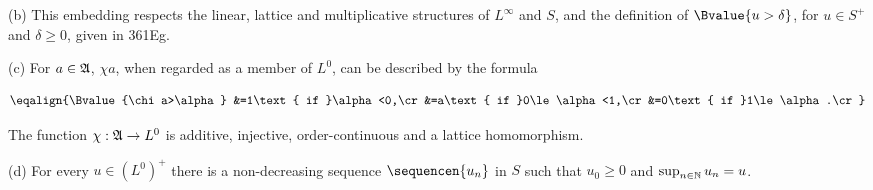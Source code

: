 (b) This embedding respects the linear, lattice and multiplicative
structures of $L^{\infty}$ and $S$, and the definition of
$\Bvalue{u>\delta}$, for $u\in S^+$ and $\delta\ge 0$, given in 361Eg.

(c) For $a\in\frak A$, $\chi a$, when regarded as a member of $L^0$, can
be described by the formula

$$\eqalign{\Bvalue{\chi a>\alpha}
&=1\text{ if }\alpha<0,\cr
&=a\text{ if }0\le\alpha<1,\cr
&=0\text{ if }1\le\alpha.\cr}$$

\noindent The function $\chi:\frak A\to L^0$ is additive, injective,
order-continuous and a lattice homomorphism.

(d) For every $u\in (L^0)^+$ there is a non-decreasing sequence
$\sequencen{u_n}$ in $S$ such that $u_0\ge 0$ and
$\sup_{n\in\Bbb N}u_n=u$.

